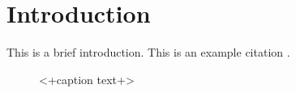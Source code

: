 \documentclass[../main.tex]{subfiles} %
\begin{document}
\section{Introduction}
This is a brief introduction. This is an example citation \cite{example_ref}.

\begin{figure}[ht]
	\centering
	
	\caption{<+caption text+>}
	\label{fig:<+label+>}
\end{figure}
\end{document}
